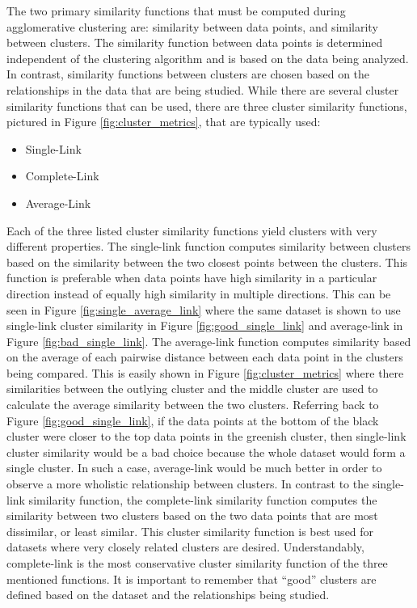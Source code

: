 \documentclass[12pt]{ucthesis}
\begin{document}
         The two primary similarity functions that must be computed during
         \textsf{agglomerative clustering} are: similarity between data points,
         and similarity between clusters. The similarity function between data
         points is determined independent of the clustering algorithm and is
         based on the data being analyzed. In contrast, similarity functions
         between clusters are chosen based on the relationships in the data
         that are being studied. While there are several cluster similarity
         functions that can be used, there are three cluster similarity
         functions, pictured in Figure \ref{fig:cluster_metrics}, that are
         typically used:
         \begin{itemize}
            \item Single-Link
            \item Complete-Link
            \item Average-Link
         \end{itemize}

         Each of the three listed cluster similarity functions yield clusters
         with very different properties. The single-link function computes
         similarity between clusters based on the similarity between the two
         closest points between the clusters. This function is preferable when
         data points have high similarity in a particular direction instead of
         equally high similarity in multiple directions. This can be seen in
         Figure \ref{fig:single_average_link} where the same dataset is shown
         to use single-link cluster similarity in Figure
         \ref{fig:good_single_link} and average-link in Figure
         \ref{fig:bad_single_link}. The average-link function computes
         similarity based on the average of each pairwise distance between each
         data point in the clusters being compared. This is easily shown in
         Figure \ref{fig:cluster_metrics} where there similarities between the
         outlying cluster and the middle cluster are used to calculate the
         average similarity between the two clusters. Referring back to Figure
         \ref{fig:good_single_link}, if the data points at the bottom of the
         black cluster were closer to the top data points in the greenish
         cluster, then single-link cluster similarity would be a bad choice
         because the whole dataset would form a single cluster. In such a case,
         average-link would be much better in order to observe a more wholistic
         relationship between clusters. In contrast to the single-link
         similarity function, the complete-link similarity function computes
         the similarity between two clusters based on the two data points that
         are most dissimilar, or least similar. This cluster similarity
         function is best used for datasets where very closely related clusters
         are desired. Understandably, complete-link is the most conservative
         cluster similarity function of the three mentioned functions. It is
         important to remember that ``good'' clusters are defined based on the
         dataset and the relationships being studied.
\end{document}

